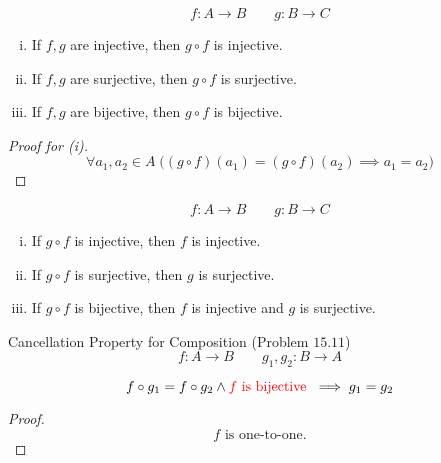 \begin{frame}{}
  \begin{theorem}
    \[
      f: A \to B \qquad g: B \to C
    \]

    \begin{enumerate}[(i)]
      \item If $f, g$ are injective, then $g \circ f$ is injective.
      \item If $f, g$ are surjective, then $g \circ f$ is surjective.
      \item If $f, g$ are bijective, then $g \circ f$ is bijective.
    \end{enumerate}
  \end{theorem}

  \pause
  \vspace{0.60cm}
  \begin{proof}[Proof for (i)]
    \[
      \forall a_1, a_2 \in A\; \Big( (g \circ f)(a_1) = (g \circ f)(a_2) \implies a_1 = a_2 \Big)
    \]
  \end{proof}
\end{frame}

\begin{frame}{}
  \begin{theorem}
    \[
      f: A \to B \qquad g: B \to C
    \]

    \begin{enumerate}[(i)]
      \item If $g \circ f$ is injective, then $f$ is injective.
      \item If $g \circ f$ is surjective, then $g$ is surjective.
      \item If $g \circ f$ is bijective, then $f$ is injective and $g$ is surjective.
    \end{enumerate}
  \end{theorem}
\end{frame}

\begin{frame}{}
  \begin{exampleblock}{Cancellation Property for Composition (Problem $15.11$)}
    \[
      f: A \to B \qquad g_1, g_2: B \to A
    \]

    \[
      f \circ g_1 = f \circ g_2 \land \textcolor{red}{f \text{ is bijective }} \implies g_1 = g_2
    \]
  \end{exampleblock}

  \pause
  \vspace{0.60cm}
  \begin{proof}
    \[
      f \text{ is one-to-one}.
    \]
  \end{proof}
\end{frame}
